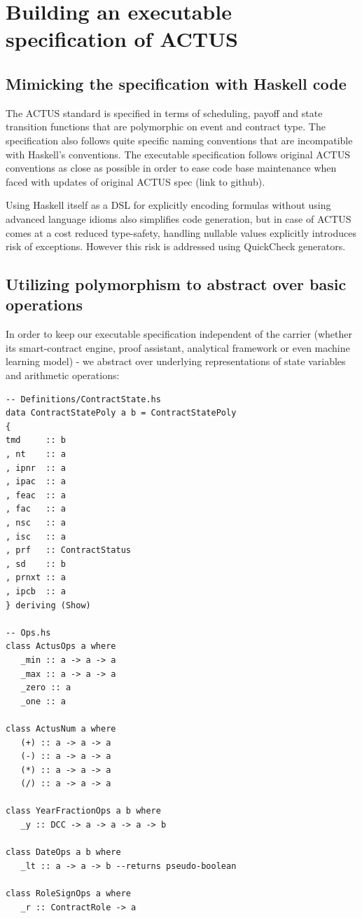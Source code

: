 \documentclass[runningheads]{llncs}
\begin{document}
\section{Building an executable specification of ACTUS}
\label{executable}

\subsection{Mimicking the specification with Haskell code}

The ACTUS standard is specified in terms of scheduling, payoff and
state transition functions that are polymorphic on event and contract
type. The specification also follows quite specific naming conventions
that are incompatible with Haskell's conventions. The executable specification
follows original ACTUS conventions as close as possible in order to
ease code base maintenance when faced with updates of original ACTUS
spec (link to github).

Using Haskell itself as a DSL for explicitly encoding formulas without
using advanced language idioms also simplifies code generation, but
in case of ACTUS comes at a cost reduced type-safety, handling nullable
values explicitly introduces risk of exceptions. However this risk
is addressed using QuickCheck generators.

\subsection{Utilizing polymorphism to abstract over basic operations}

In order to keep our executable specification independent of the carrier
(whether its smart-contract engine, proof assistant, analytical framework
or even machine learning model) - we abstract over underlying representations
of state variables and arithmetic operations:

\begin{verbatim}
-- Definitions/ContractState.hs 
data ContractStatePoly a b = ContractStatePoly  
{  
tmd     :: b  
, nt    :: a  
, ipnr  :: a  
, ipac  :: a  
, feac  :: a  
, fac   :: a  
, nsc   :: a  
, isc   :: a  
, prf   :: ContractStatus  
, sd    :: b  
, prnxt :: a  
, ipcb  :: a  
} deriving (Show) 

-- Ops.hs
class ActusOps a where    
   _min :: a -> a -> a
   _max :: a -> a -> a
   _zero :: a
   _one :: a

class ActusNum a where
   (+) :: a -> a -> a
   (-) :: a -> a -> a
   (*) :: a -> a -> a
   (/) :: a -> a -> a

class YearFractionOps a b where
   _y :: DCC -> a -> a -> a -> b   

class DateOps a b where
   _lt :: a -> a -> b --returns pseudo-boolean   

class RoleSignOps a where
   _r :: ContractRole -> a
\end{verbatim}
\end{document}
